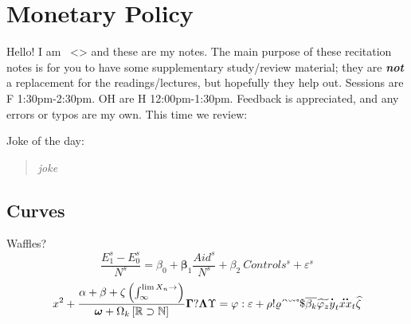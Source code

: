 \documentclass{article}
\begin{document}
\displayoptions

\section{Monetary Policy}

Hello! I am \mcauthor\ <\href{mailto:\mcemail{}?subject=Hi, I'm the subject}{\mcemail}> and these are my notes. The main purpose of these recitation notes is for you to have some supplementary study/review material; they are \textbf{\textit{not}} a replacement for the readings/lectures, but hopefully they help out. Sessions are F 1:30pm-2:30pm. OH are H 12:00pm-1:30pm. Feedback is appreciated, and any errors or typos are my own. This time we review:\label{toc:toc}


\begin{hidelevel}{1}
  Joke of the day:
  \begin{quote}\vspace{-12pt}\itshape
    joke
  \end{quote}
\end{hidelevel}

\subsection{Curves}
\label{sub:curves}

Waffles?
\begin{equation}
  \dfrac{E_1^s - E_0^s}{N^s}
  = \beta_0 + \bm\beta_1 \dfrac{Aid^s}{N^s} + \beta_2 ~ Controls^s + \varepsilon^s
\end{equation}
\[
  x^2 + \dfrac{\alpha + \beta + \zeta \left(\int_{\infty}^{\lim X_n \to \empty}\right)}{\bm \omega + \Omega_k \left[\mathbb{R} \supset \mathbb{N}\right]}
  \bm\Gamma ? \bm\Lambda\Upsilon = \varphi : \varepsilon + \rho ! \varrho
\acute ~ \grave ~ \breve ~ \check ~ \mathring ~ \mathdollar
\overline{\beta_k} \widetilde{\varphi_z} \dot{y}_t \ddot{xx}_t \widehat{\zeta}
\]


\uptotoc
\end{document}
